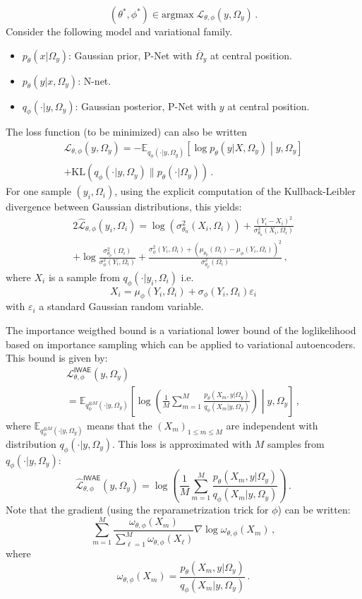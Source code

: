 $$
(\theta^*,\phi^*) \in \mathrm{argmax} \; \mathcal{L}_{\theta,\phi}(y,\Omega_y)\,.
$$
Consider the following model and variational family.
\begin{itemize}
\item $p_\theta(x|\Omega_y)$: Gaussian prior, P-Net with $\overline \Omega_y$ at central position.
\item $p_\theta(y|x,\Omega_y)$: N-net.
\item $q_{\phi}(\cdot|y,\Omega_y)$: Gaussian posterior, P-Net with $y$ at central position.
\end{itemize}
The loss function (to be minimized) can also be written
\begin{multline*}
 \mathcal{L}_{\theta,\phi}(y,\Omega_y)  =   -\mathbb{E}_{q_{\phi}(\cdot|y,\Omega_y)}\left[\log p_\theta(y|X,\Omega_y)\middle |y,\Omega_y\right] \\ + \mathrm{KL}\left(q_{\phi}(\cdot|y,\Omega_y)\| p_\theta(\cdot|\Omega_y)\right)\,.
\end{multline*}
For one sample $(y_i,\Omega_i)$, using the explicit computation of the  Kullback-Leibler divergence between Gaussian distributions, this yields:
\begin{multline*}
2\widehat{\mathcal{L}}_{\theta,\phi}(y_i,\Omega_i)  =   \log(\sigma^2_{\theta_n}(X_i,\Omega_i)) + \frac{(Y_i-X_i)^2}{\sigma^2_{\theta_n}(X_i,\Omega_i)} \\ + \log\frac{\sigma^2_{\theta_p}(\Omega_i)}{\sigma^2_{\phi}(Y_i,\Omega_i)} + \frac{\sigma^2_{\phi}(Y_i,\Omega_i) + \left(\mu_{\theta_p}(\Omega_i) - \mu_\phi(Y_i,\Omega_i)\right)^2}{\sigma^2_{\theta_p}(\Omega_i)}\,,
\end{multline*}
where $X_i$ is a sample from $q_\phi(\cdot|y_i,\Omega_i)$ i.e.
$$
X_i = \mu_\phi(Y_i,\Omega_i) + \sigma_\phi(Y_i,\Omega_i)\varepsilon_i
$$
with $\varepsilon_i$ a standard Gaussian random variable.

The importance weigthed bound is a variational lower bound of the loglikelihood based on importance sampling which can be applied to variational autoencoders. This bound is given by:
\begin{multline*}
 \mathcal{L}^{\mathsf{IWAE}}_{\theta,\phi}(y,\Omega_y)  \\
= \mathbb{E}_{q^{\otimes M}_{\phi}(\cdot|y,\Omega_y)}\left[\log \left(\frac{1}{M}\sum_{m=1}^M\frac{p_\theta(X_m,y|\Omega_y)}{q_{\phi}(X_m|y,\Omega_y)}\right)\middle |y,\Omega_y\right]\,,
\end{multline*}
where $\mathbb{E}_{q^{\otimes M}_{\phi}(\cdot|y,\Omega_y)}$ means that the $(X_m)_{1\leqslant m \leqslant M}$ are independent with distribution $q_{\phi}(\cdot|y,\Omega_y)$. This loss is approximated with $M$ samples from $q_{\phi}(\cdot|y,\Omega_y)$:
$$
 \widehat{\mathcal{L}}^{\mathsf{IWAE}}_{\theta,\phi}(y,\Omega_y)
= \log \left(\frac{1}{M}\sum_{m=1}^M\frac{p_\theta(X_m,y|\Omega_y)}{q_{\phi}(X_m|y,\Omega_y)}\right)\,.
$$
Note that the gradient (using the reparametrization trick for $\phi$)  can be written:
$$
\sum_{m=1}^M \frac{\omega_{\theta,\phi}(X_m)}{\sum_{\ell=1}^M\omega_{\theta,\phi}(X_\ell)} \nabla\log \omega_{\theta,\phi}(X_m)\,,
$$
where
$$
\omega_{\theta,\phi}(X_m) = \frac{p_\theta(X_m,y|\Omega_y)}{q_{\phi}(X_m|y,\Omega_y)}\,.
$$

